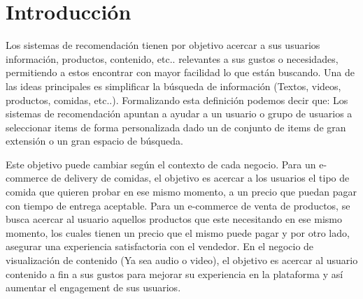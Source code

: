 \documentclass[11pt,a4paper]{tesis}
\begin{document}

\def\autor{Adrian Norberto Marino}
\def\tituloTesis{Sistemas de Recomendación}
\def\runtitulo{Resumen}
\def\runtitle{Sistemas de Recomendación}
\def\lugar{Buenos Aires, 2022}


\frontmatter
\pagestyle{empty}





\tableofcontents

\mainmatter
\pagestyle{headings}


\chapter{Introducción}

Los sistemas de recomendación tienen por objetivo acercar a sus usuarios información, productos, contenido, etc.. relevantes a sus gustos o necesidades, permitiendo a estos encontrar con mayor facilidad lo que están buscando. Una de las ideas principales es simplificar la búsqueda de información (Textos,   videos, productos, comidas, etc..).  Formalizando esta definición podemos decir que:  Los sistemas de recomendación apuntan a ayudar a un usuario o grupo de usuarios a seleccionar items de forma personalizada dado un de conjunto de items de gran extensión o un gran espacio de búsqueda.


Este objetivo puede cambiar según el contexto de cada negocio. Para un e-commerce de delivery de comidas, el objetivo es acercar a los usuarios el tipo de comida que quieren probar en ese mismo momento, a un precio que puedan pagar con tiempo de entrega aceptable. Para un e-commerce de venta de productos, se busca acercar al usuario aquellos productos que este necesitando en ese mismo momento, los cuales tienen un precio que el mismo puede pagar y por otro lado, asegurar una experiencia satisfactoria con el vendedor. En el negocio de visualización de contenido (Ya sea audio o video), el objetivo es acercar al usuario contenido a fin a sus gustos para mejorar su experiencia en la plataforma y así aumentar el engagement de sus usuarios.
\end{document}
